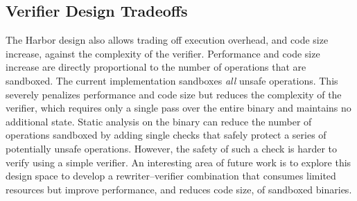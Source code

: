 \subsection{Verifier Design Tradeoffs}
\label{sec:verifydesignspace}
The Harbor design also allows trading off execution overhead, and code size
increase, against the complexity of the verifier.
%
Performance and code size increase are directly proportional to the
number of operations that are sandboxed.
%
The current implementation sandboxes \textit{all} unsafe operations.
%
This severely penalizes performance and code size but reduces the
complexity of the verifier, which requires only a single pass over the
entire binary and maintains no additional state.
%
Static analysis on the binary can reduce the number of operations
sandboxed by adding single checks that safely protect a series of
potentially unsafe operations.
%
However, the safety of such a check is harder to verify using a simple
verifier.
%
%
An interesting area of future work is to explore this design space to
develop a rewriter--verifier combination that consumes limited
resources but improve performance, and reduces code size, of sandboxed
binaries.
